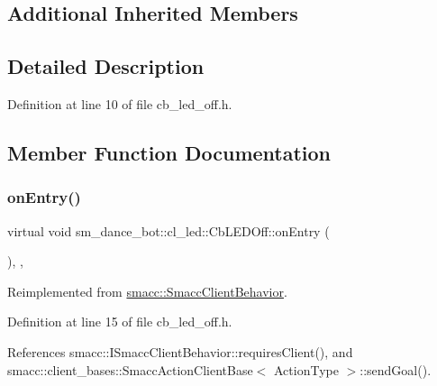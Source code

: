 \subsection*{Additional Inherited Members}


\subsection{Detailed Description}


Definition at line 10 of file cb\+\_\+led\+\_\+off.\+h.



\subsection{Member Function Documentation}
\mbox{\label{classsm__dance__bot_1_1cl__led_1_1CbLEDOff_a3c0ed097db52baae1928a19936f09a83}} 
\subsubsection{\texorpdfstring{on\+Entry()}{onEntry()}}
{\footnotesize\ttfamily virtual void sm\+\_\+dance\+\_\+bot\+::cl\+\_\+led\+::\+Cb\+L\+E\+D\+Off\+::on\+Entry (\begin{DoxyParamCaption}{ }\end{DoxyParamCaption})\hspace{0.3cm}{\ttfamily [inline]}, {\ttfamily [override]}, {\ttfamily [virtual]}}



Reimplemented from \hyperlink{classsmacc_1_1SmaccClientBehavior_ad5d3e1f1697c3cfe66c94cadba948493}{smacc\+::\+Smacc\+Client\+Behavior}.



Definition at line 15 of file cb\+\_\+led\+\_\+off.\+h.



References smacc\+::\+I\+Smacc\+Client\+Behavior\+::requires\+Client(), and smacc\+::client\+\_\+bases\+::\+Smacc\+Action\+Client\+Base$<$ Action\+Type $>$\+::send\+Goal().


